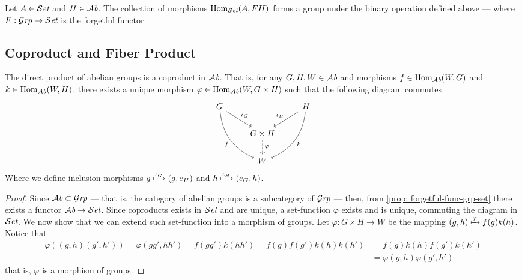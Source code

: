\begin{corollary}
  Let \(A \in {\mathcal{S}\textit{et}}\) and \(H \in {\mathcal{A}\textit{b}}\). The collection of morphisms
  \(\operatorname{Hom}_{\mathcal{S}\textit{et}}(A, FH)\) forms a group under the binary operation defined above
  --- where \(F: {\mathcal{G}\textit{rp}} \to {\mathcal{S}\textit{et}}\) is the forgetful functor.
\end{corollary}

\subsection{Coproduct and Fiber Product}

\begin{proposition}[Coproduct in \(\Ab\)]\label{prop: coprod-ab}
  The direct product of abelian groups is a coproduct in \(\Ab\). That is, for
  any \(G, H, W \in {\mathcal{A}\textit{b}}\) and morphisms \(f \in \operatorname{Hom}_{\mathcal{A}\textit{b}}(W, G)\) and \(k \in
  \operatorname{Hom}_{\mathcal{A}\textit{b}}(W, H)\), there exists a unique morphism \(\varphi \in \operatorname{Hom}_{\mathcal{A}\textit{b}}(W, G
  \times H)\) such that the following diagram commutes
  \[
    \begin{tikzcd}
      G \ar[dr, "\iota_G"] \ar[ddr, bend right, swap, "f"] &
      &H \ar[dl, swap, "\iota_H"] \ar[ddl, bend left, "k"] \\
      &G \times H \ar[d, dashed, "\varphi"]  & \\
      &W &
    \end{tikzcd}
  \]
  Where we define inclusion morphisms \(g \xmapsto{\iota_G} (g, e_H)\) and \(h
  \xmapsto{\iota_H} (e_G, h)\).
\end{proposition}

\begin{proof}
  Since \({\mathcal{A}\textit{b}} \subset {\mathcal{G}\textit{rp}}\) --- that is, the category of abelian groups is a
  subcategory of \({\mathcal{G}\textit{rp}}\) --- then, from \cref{prop: forgetful-func-grp-set}
  there exists a functor \({\mathcal{A}\textit{b}} \to {\mathcal{S}\textit{et}}\). Since coproducts exists in \({\mathcal{S}\textit{et}}\)
  and are unique, a set-function \(\varphi\) exists and is unique, commuting the
  diagram in \({\mathcal{S}\textit{et}}\). We now show that we can extend such set-function into a
  morphism of groups. Let \(\varphi: G \times H \to W\) be the mapping \((g, h)
  \xmapsto \varphi f(g) k(h)\). Notice that
  \begin{align*}
    \varphi((g, h)(g', h'))
    = \varphi(gg', hh')
    = f(g g') k(hh')
    = f(g) f(g') k(h) k(h')
    &= f(g) k(h) f(g') k(h') \\
    &= \varphi(g, h) \varphi(g', h')
  \end{align*}
  that is, \(\varphi\) is a morphism of groups.
\end{proof}

